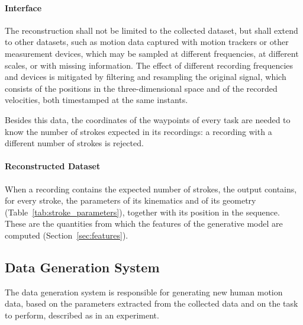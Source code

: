 \documentclass[12pt]{report}
\begin{document}
\paragraph{Interface} 
The reconstruction shall not be limited to the collected dataset, but shall extend to other datasets, such as motion data captured with motion trackers or other measurement devices, which may be sampled at different frequencies, at different scales, or with missing information. The effect of different recording frequencies and devices is mitigated by filtering and resampling the original signal, which consists of the positions in the three-dimensional space and of the recorded velocities, both timestamped at the same instants.

Besides this data, the coordinates of the waypoints of every task are needed to know the number of strokes expected in its recordings: a recording with a different number of strokes is rejected.

\paragraph{Reconstructed Dataset}
When a recording contains the expected number of strokes, the output contains, for every stroke, the parameters of its kinematics and of its geometry (Table~\ref{tab:stroke_parameters}), together with its position in the sequence. These are the quantities from which the features of the generative model are computed (Section~\ref{sec:features}).

\subsection{Data Generation System}
\label{sec:data_generation_system}
The data generation system is responsible for generating new human motion data, based on the parameters extracted from the collected data and on the task to perform, described as in an experiment.
\end{document}

